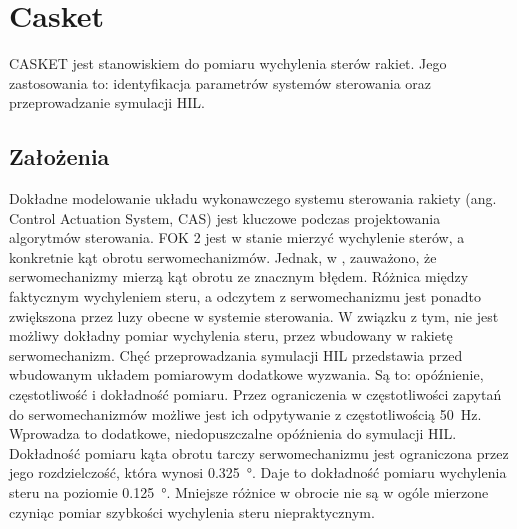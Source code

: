 \section{Casket}
\label{sec:casket}
CASKET jest stanowiskiem do pomiaru wychylenia sterów rakiet.
Jego zastosowania to: identyfikacja parametrów systemów sterowania
oraz przeprowadzanie symulacji HIL.
\subsection{Założenia}
\label{subsec:casket-zalozenia}
Dokładne modelowanie układu wykonawczego systemu sterowania rakiety (ang. Control Actuation System, CAS)
jest kluczowe podczas projektowania algorytmów sterowania. FOK 2 jest w stanie mierzyć wychylenie
sterów, a konkretnie kąt obrotu serwomechanizmów. Jednak, w \cite{olgierd}, zauważono, 
że serwomechanizmy mierzą kąt obrotu ze znacznym błędem. Różnica między faktycznym wychyleniem steru,
a odczytem z serwomechanizmu jest ponadto zwiększona przez luzy obecne w systemie sterowania. 
W związku z tym, nie jest możliwy dokładny pomiar wychylenia steru, przez wbudowany w rakietę serwomechanizm. 
Chęć przeprowadzania symulacji HIL przedstawia przed wbudowanym układem pomiarowym dodatkowe wyzwania.
Są to: opóźnienie, częstotliwość i dokładność pomiaru. Przez ograniczenia w częstotliwości zapytań do serwomechanizmów
możliwe jest ich odpytywanie z częstotliwością \SI{50}{\hertz}. Wprowadza to dodatkowe, niedopuszczalne opóźnienia
do symulacji HIL. Dokładność pomiaru kąta obrotu tarczy serwomechanizmu jest ograniczona przez jego rozdzielczość, 
która wynosi \SI{0.325}{\degree}. Daje to dokładność pomiaru wychylenia steru na poziomie \SI{0.125}{\degree}. 
Mniejsze różnice w obrocie nie są w ogóle mierzone czyniąc pomiar szybkości wychylenia steru niepraktycznym.

